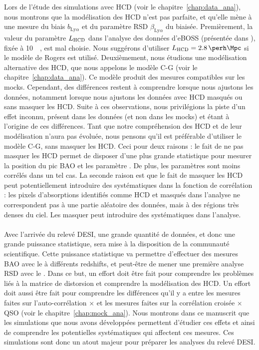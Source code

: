 \documentclass[11pt, twoside, a4paper, openright]{report}
\begin{document}
Lors de l'étude des simulations avec HCD (voir le chapitre~\ref{chap:data_ana}), nous montrons que la modélisation des HCD n'est pas parfaite, et qu'elle mène à une mesure du biais $b_{\mathrm{Ly}\alpha}$ et du paramètre RSD $\beta_{\mathrm{Ly}\alpha}$ du \lya{} biaisée.
Premièrement, la valeur du paramètre $L_{\textsc{HCD}}$ dans l'analyse des données d'eBOSS (présentée dans \textcite{DuMasdesBourboux2020}), fixée à \SI{10}{\perh\Mpc}, est mal choisie. Nous suggérons d'utiliser $L_{\textsc{HCD}} = \SI{2.8}{\perh\Mpc}$ si le modèle de Rogers est utilisé.
Deuxièmement, nous étudions une modélisation alternative des HCD, que nous appelons le modèle C-G (voir le chapitre~\ref{chap:data_ana}). Ce modèle produit des mesures compatibles sur les mocks. Cependant, des différences restent à comprendre lorsque nous ajustons les données, notamment lorsque nous ajustons les données avec HCD masqués ou sans masquer les HCD. Suite à ces observations, nous privilégions la piste d'un effet inconnu, présent dans les données (et non dans les mocks) et étant à l'origine de ces différences.
Tant que notre compréhension des HCD et de leur modélisation n'aura pas évoluée, nous pensons qu'il est préférable d'utiliser le modèle C-G, sans masquer les HCD. Ceci pour deux raisons : le fait de ne pas masquer les HCD permet de disposer d'une plus grande statistique pour mesurer la position du pic BAO et les paramètre \lya{}. De plus, les paramètres \lya{} sont moins corrélés dans un tel cas. La seconde raison est que le fait de masquer les HCD peut potentiellement introduire des systématiques dans la fonction de corrélation : les pixels d'absorptions identifiés comme HCD et masqués dans l'analyse ne correspondent pas à une partie aléatoire des données, mais à des régions très denses du ciel. Les masquer peut introduire des systématiques dans l'analyse.


\paragraph{}
Avec l'arrivée du relevé DESI, une grande quantité de données, et donc une grande puissance statistique, sera mise à la disposition de la communauté scientifique. Cette puissance statistique va permettre d'effectuer des mesures BAO avec le \lya{} à différents redshifts, et peut-être de mener une première analyse RSD avec le \lya{}. Dans ce but, un effort doit être fait pour comprendre les problèmes liés à la matrice de distorsion et comprendre la modélisation des HCD. Un effort doit aussi être fait pour comprendre les différences qu'il y a entre les mesures faites sur l'auto-corrélation \lya{}$\times$\lya{} et les mesures faites sur la corrélation croisée \lya{}$\times$QSO (voir le chapitre~\ref{chap:mock_ana}).
Nous montrons dans ce manuscrit que les simulations que nous avons développées permettent d'étudier ces effets et ainsi de comprendre les potentielles systématiques qui affectent ces mesures. Ces simulations sont donc un atout majeur pour préparer les analyses \lya{} du relevé DESI.


\printbibliography
\end{document}
